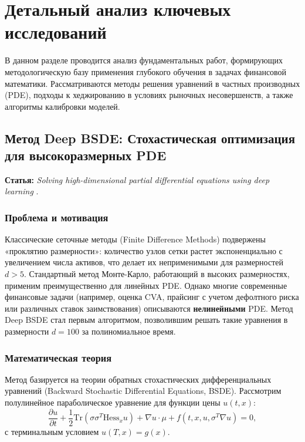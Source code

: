 \documentclass[12pt, a4paper]{article}
\begin{document}
\section{Детальный анализ ключевых исследований}

В данном разделе проводится анализ фундаментальных работ, формирующих методологическую базу применения глубокого обучения в задачах финансовой математики. Рассматриваются методы решения уравнений в частных производных (PDE), подходы к хеджированию в условиях рыночных несовершенств, а также алгоритмы калибровки моделей.

\subsection{Метод Deep BSDE: Стохастическая оптимизация для высокоразмерных PDE}
\textbf{Статья:} \textit{Solving high-dimensional partial differential equations using deep learning} \cite{Han2018}.

\subsubsection{Проблема и мотивация}
Классические сеточные методы (Finite Difference Methods) подвержены «проклятию размерности»: количество узлов сетки растет экспоненциально с увеличением числа активов, что делает их неприменимыми для размерностей $d > 5$. Стандартный метод Монте-Карло, работающий в высоких размерностях, применим преимущественно для линейных PDE.
Однако многие современные финансовые задачи (например, оценка CVA, прайсинг с учетом дефолтного риска или различных ставок заимствования) описываются \textbf{нелинейными} PDE. Метод Deep BSDE стал первым алгоритмом, позволившим решать такие уравнения в размерности $d=100$ за полиномиальное время.

\subsubsection{Математическая теория}
Метод базируется на теории обратных стохастических дифференциальных уравнений (Backward Stochastic Differential Equations, BSDE). Рассмотрим полулинейное параболическое уравнение для функции цены $u(t, x)$:
\begin{equation}
    \frac{\partial u}{\partial t} + \frac{1}{2}\text{Tr}(\sigma\sigma^T \text{Hess}_x u) + \nabla u \cdot \mu + f(t, x, u, \sigma^T \nabla u) = 0,
\end{equation}
с терминальным условием $u(T, x) = g(x)$.
\end{document}
